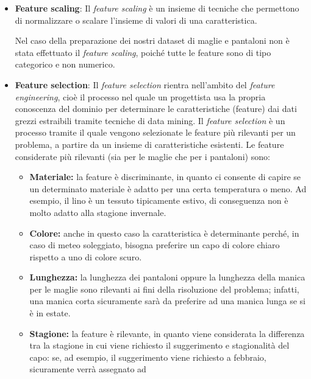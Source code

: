 \documentclass[a4paper, 11pt, oneside]{report}
\begin{document}
\begin{itemize}
                    \item \textbf{Feature scaling}: Il \textit{feature scaling} è un insieme di tecniche che permettono di
                    normalizzare o scalare l'insieme di valori di una caratteristica.
                    \par \noindent Nel caso della preparazione dei nostri dataset di maglie e pantaloni non è stata effettuato
                    il  \textit{feature scaling}, poiché tutte le feature sono di tipo categorico e non numerico.
                    \item \textbf{Feature selection}: Il \textit{feature selection} rientra nell'ambito del \textit{feature engineering},
                    cioè il processo nel quale un progettista usa la propria conoscenza del dominio per determinare le caratteristiche
                    (feature) dai dati grezzi estraibili tramite tecniche di data mining. Il \textit{feature selection} è un processo tramite
                    il quale vengono selezionate le feature più rilevanti per un problema, a partire da un insieme di caratteristiche esistenti.
                    Le feature considerate più rilevanti (sia per le maglie che per i pantaloni) sono:
                    \begin{itemize}
                        \item \textbf{Materiale:} la feature è discriminante, in quanto ci consente di capire se un determinato materiale è adatto per
                        una certa temperatura o meno. Ad esempio, il lino è un tessuto tipicamente estivo, di conseguenza non è molto adatto alla
                        stagione invernale.
                        \item \textbf{Colore:} anche in questo caso la caratteristica è determinante perché, in caso di meteo soleggiato, bisogna preferire
                        un capo di colore chiaro rispetto a uno di colore scuro.
                        \item \textbf{Lunghezza:} la lunghezza dei pantaloni oppure la lunghezza della manica per le maglie sono rilevanti ai fini della
                        risoluzione del problema; infatti, una manica corta sicuramente sarà da preferire ad una manica lunga se si è in estate.
                        \item \textbf{Stagione:} la feature è rilevante, in quanto viene considerata la differenza tra la stagione in cui viene richiesto il
                        suggerimento e stagionalità del capo: se, ad esempio, il suggerimento viene richiesto a febbraio, sicuramente verrà assegnato ad

\end{itemize}
\end{itemize}
\end{document}
